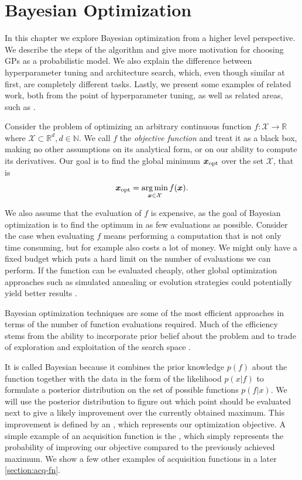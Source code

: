 \chapter{Bayesian Optimization}
\label{chapter:bo}

In this chapter we explore Bayesian optimization from a higher level perspective. We describe the steps of the algorithm and give more motivation for choosing GPs as a probabilistic model. We also explain the difference between hyperparameter tuning and architecture search, which, even though similar at first, are completely different tasks. Lastly, we present some examples of related work, both from the point of hyperparameter tuning, as well as related areas, such as \cite{automl}.

Consider the problem of optimizing an arbitrary continuous function $f: \mathcal{X} \rightarrow \mathbb{R}$
where $\mathcal{X} \subset \mathbb{R}^d, d \in \mathbb{N}$. We call $f$ the \emph{objective function} and treat it
as a black box, making no other assumptions on its analytical form, or on our
ability to compute its derivatives. Our goal is to find the global minimum
${\boldsymbol{x}}_\text{opt}$ over the set $\mathcal{X}$, that is
$$
{\boldsymbol{x}}_\text{opt} = \operatorname*{arg\,min}_{{\boldsymbol{x}} \in \mathcal{X}} f({\boldsymbol{x}}).
$$

We also assume that the evaluation of $f$ is expensive, as the goal of Bayesian
optimization is to find the optimum in as few evaluations as possible. Consider
the case when evaluating $f$ means performing a computation that is not only
time consuming, but for example also costs a lot of money. We might only have a
fixed budget which puts a hard limit on the number of evaluations we can
perform. If the function can be evaluated cheaply, other global optimization
approaches such as simulated annealing or evolution strategies could
potentially yield better results \citep{google-vizier}.

Bayesian optimization techniques are some of the most efficient approaches in
terms of the number of function evaluations required. Much of the efficiency
stems from the ability to incorporate prior belief about the problem and to
trade of exploration and exploitation of the search space
\citep{nando-bopt-tutorial}.

It is called Bayesian because it combines the prior knowledge $p(f)$ about the
function together with the data in the form of the likelihood $p(x|f)$ to
formulate a posterior distribution on the set of possible functions $p(f|x)$.
We will use the posterior distribution to figure out which point should be
evaluated next to give a likely improvement over the currently obtained
maximum. This improvement is defined by an ,
which represents our optimization objective. A simple
example of an acquisition function is the ,
which simply represents the probability of improving our objective compared to
the previously achieved maximum. We show a few other examples of
acquisition functions in a later \autoref{section:acq-fn}.


